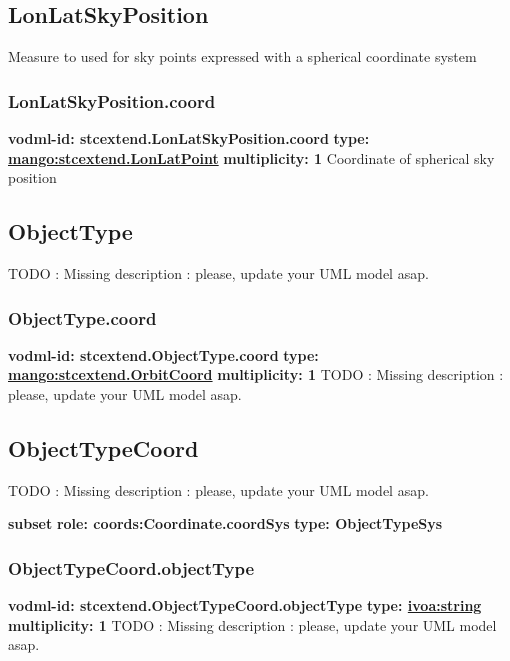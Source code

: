   \subsection{LonLatSkyPosition}
  \label{sect:stcextend.LonLatSkyPosition}
    Measure to used for sky points expressed with a spherical coordinate system

    \subsubsection{LonLatSkyPosition.coord}
      \textbf{vodml-id: stcextend.LonLatSkyPosition.coord} \newline
      \textbf{type: \hyperref[sect:stcextend.LonLatPoint]{mango:stcextend.LonLatPoint}} \newline
      \textbf{multiplicity: 1} \newline 
      Coordinate of spherical sky position

  \subsection{ObjectType}
  \label{sect:stcextend.ObjectType}
    TODO : Missing description : please, update your UML model asap.

    \subsubsection{ObjectType.coord}
      \textbf{vodml-id: stcextend.ObjectType.coord} \newline
      \textbf{type: \hyperref[sect:stcextend.OrbitCoord]{mango:stcextend.OrbitCoord}} \newline
      \textbf{multiplicity: 1} \newline 
      TODO : Missing description : please, update your UML model asap.

  \subsection{ObjectTypeCoord}
  \label{sect:stcextend.ObjectTypeCoord}
    TODO : Missing description : please, update your UML model asap.

    \noindent \textbf{subset} \newline
    \indent   \textbf{role: coords:Coordinate.coordSys} \newline
    \indent   \textbf{type: ObjectTypeSys} \newline


    \subsubsection{ObjectTypeCoord.objectType}
      \textbf{vodml-id: stcextend.ObjectTypeCoord.objectType} \newline
      \textbf{type: \hyperref[sect:ivoa]{ivoa:string}} \newline
      \textbf{multiplicity: 1} \newline 
      TODO : Missing description : please, update your UML model asap.

